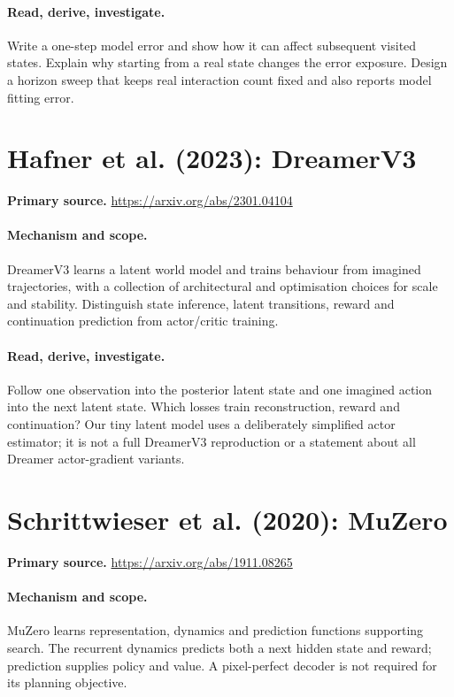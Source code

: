 \documentclass[11pt]{scrartcl}
\begin{document}
\paragraph{Read, derive, investigate.} Write a one-step model error and show how it can affect subsequent visited states. Explain why starting from a real state changes the error exposure. Design a horizon sweep that keeps real interaction count fixed and also reports model fitting error.

\section{Hafner et al. (2023): DreamerV3}
\noindent\textbf{Primary source.} \url{https://arxiv.org/abs/2301.04104}

\paragraph{Mechanism and scope.} DreamerV3 learns a latent world model and trains behaviour from imagined trajectories, with a collection of architectural and optimisation choices for scale and stability. Distinguish state inference, latent transitions, reward and continuation prediction from actor/critic training.

\paragraph{Read, derive, investigate.} Follow one observation into the posterior latent state and one imagined action into the next latent state. Which losses train reconstruction, reward and continuation? Our tiny latent model uses a deliberately simplified actor estimator; it is not a full DreamerV3 reproduction or a statement about all Dreamer actor-gradient variants.

\section{Schrittwieser et al. (2020): MuZero}
\noindent\textbf{Primary source.} \url{https://arxiv.org/abs/1911.08265}

\paragraph{Mechanism and scope.} MuZero learns representation, dynamics and prediction functions supporting search. The recurrent dynamics predicts both a next hidden state and reward; prediction supplies policy and value. A pixel-perfect decoder is not required for its planning objective.
\end{document}

